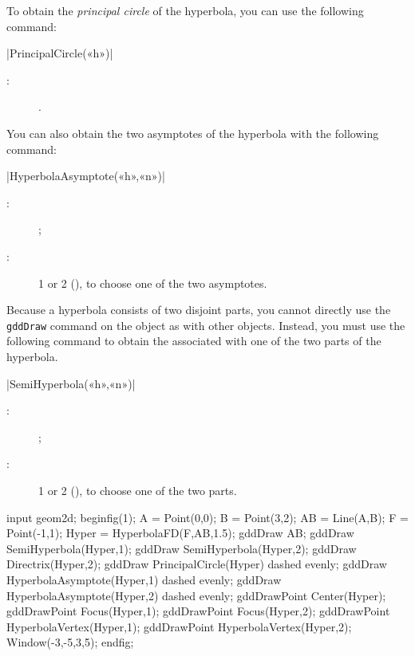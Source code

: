 \documentclass[a4paper,english]{article}
\begin{document}
To obtain the \emph{principal circle} of the hyperbola, you can use the
following command:

\begin{colourband}
  \macro|PrincipalCircle(«h»)|
  \begin{description}
    \item[:]  .
  \end{description}
\end{colourband}
\bigskip

You can also obtain the two asymptotes of the hyperbola with the following command:

\begin{colourband}
  \macro|HyperbolaAsymptote(«h»,«n»)|
  \begin{description}
    \item[:]   ;
    \item[:]  1 or 2 (), to choose one of the two
    asymptotes. 
  \end{description}
\end{colourband}
\bigskip

Because a hyperbola consists of two disjoint parts, you cannot directly use the
\lstinline+gddDraw+ command on the object as with other \mpgeomdd objects. Instead,
you must use the following command to obtain the  associated with
one of the two parts of the hyperbola.

\begin{colourband}
  \macro|SemiHyperbola(«h»,«n»)|
  \begin{description}
    \item[:]  ;
    \item[:]  1 or 2 (), to choose one of the two parts.
  \end{description}
\end{colourband}
\bigskip


\begin{ExempleMP}
input geom2d;
beginfig(1);
A = Point(0,0);
B = Point(3,2);
AB = Line(A,B);
F = Point(-1,1);
Hyper = HyperbolaFD(F,AB,1.5);
gddDraw AB;
gddDraw SemiHyperbola(Hyper,1);
gddDraw SemiHyperbola(Hyper,2);
gddDraw Directrix(Hyper,2);
gddDraw PrincipalCircle(Hyper) dashed evenly;
gddDraw HyperbolaAsymptote(Hyper,1) dashed evenly;
gddDraw HyperbolaAsymptote(Hyper,2) dashed evenly;
gddDrawPoint Center(Hyper);
gddDrawPoint Focus(Hyper,1);
gddDrawPoint Focus(Hyper,2);
gddDrawPoint HyperbolaVertex(Hyper,1);
gddDrawPoint HyperbolaVertex(Hyper,2);
Window(-3,-5,3,5);
endfig;
\end{ExempleMP}
\end{document}
